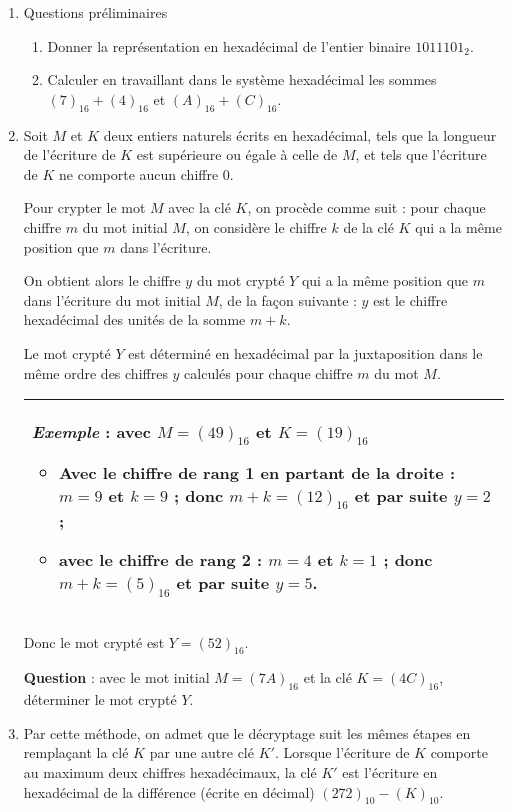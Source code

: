 \documentclass[a4paper,10pt]{book}
\begin{document}
\begin{enumerate}[\bfseries 1.]
	\item Questions préliminaires
	\begin{enumerate}[\bfseries a.]
		\item Donner la représentation en hexadécimal de l'entier binaire $1011101_2$.
		\item Calculer en travaillant dans le système hexadécimal les sommes $(7)_{16} + (4)_{16}$ et $(A)_{16} + (C)_{16}$.
	\end{enumerate}
	\item Soit $M$ et $K$ deux entiers naturels écrits en hexadécimal, tels que la longueur de l'écriture de $K$ est supérieure ou égale à celle de $M$, et tels que l'écriture de $K$ ne comporte aucun chiffre $0$.

	Pour crypter le mot $M$ avec la clé $K$, on procède comme suit : pour chaque  chiffre $m$ du mot
	initial $M$, on considère le chiffre $k$ de la clé $K$ qui a la même position que $m$ dans l'écriture.

	On obtient alors le chiffre $y$ du mot crypté $Y$ qui a la même position que $m$ dans l'écriture du mot initial $M$, de la façon suivante : $y$ est le chiffre hexadécimal des unités de la somme $m + k$.

	Le mot crypté $Y$ est déterminé en hexadécimal par la juxtaposition dans le même ordre des
	chiffres $y$ calculés pour chaque chiffre $m$ du mot $M$.

	\begin{center}
		\begin{tabularx}{\linewidth}{|X|}\hline
			\emph{Exemple} : avec $M =(49)_{16}$ et $K = (19)_{16}$
			\begin{itemize}
				\item Avec le chiffre de rang 1 en partant de la droite : $m = 9$ et $k = 9$ ; donc $m + k = (12)_{16}$ et par suite $y = 2$ ;
				\item avec le chiffre de rang 2 : $m = 4$ et $k = 1$ ; donc $m +k = (5)_{16}$ et par suite $y = 5$.
			\end{itemize}\\\hline
		\end{tabularx}
	\end{center}

	Donc le mot crypté est $Y = (52)_{16}$.

	\smallskip

	\textbf{Question }: avec le mot initial $M = (7 A)_{16}$ et la clé $K = (4C)_{16}$, déterminer le mot crypté $Y$.
	\item Par cette méthode, on admet que le décryptage suit les mêmes étapes en remplaçant la clé $K$ par une autre clé $K'$. Lorsque l'écriture de $K$ comporte au maximum deux chiffres hexadécimaux,
	la clé $K'$ est l'écriture en hexadécimal de la différence (écrite en décimal) $(272)_{10} - (K)_{10}$.


\end{enumerate}
\end{document}
